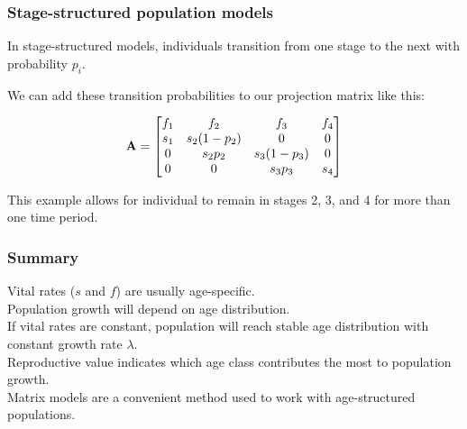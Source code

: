 \documentclass[color=usenames,dvipsnames]{beamer}\usepackage[]{graphicx}\usepackage[]{color}
\begin{document}
\begin{frame}
  \frametitle{Stage-structured population models}
  \large
  {In stage-structured models, individuals transition from one
    stage to the next with probability $p_i$. \par
    \vfill
    \pause
    We can add these
    transition probabilities to our projection matrix like this:}
  \pause
  \vfill
  \begin{center}
    \[
    {\bf A} =
    \begin{bmatrix}
      f_1 & f_2 & f_3 & f_4 \\
      s_1 & s_2(1-p_2) & 0 & 0 \\
      0 & s_2 p_2 & s_3(1-p_3) & 0 \\
      0 & 0 & s_3p_3 & s_4
    \end{bmatrix}
    \]
  \end{center}
\pause
\vfill
This example allows for individual to remain in stages 2, 3, and 4 for 
more than one time period.
\end{frame}







\begin{frame}
  \frametitle{Summary}
  Vital rates ($s$ and $f$) are usually age-specific. \\
  \pause
  \vfill
  Population growth will depend on age distribution. \\
  \pause
  \vfill
  If vital rates are constant, population will reach stable
  age distribution with constant growth rate $\lambda$. \\
  \pause
  \vfill
  Reproductive value indicates which age class contributes the
  most to population growth. \\
  \pause
  \vfill
  Matrix models are a convenient method used to work with
  age-structured populations. \\
\end{frame}
\end{document}
